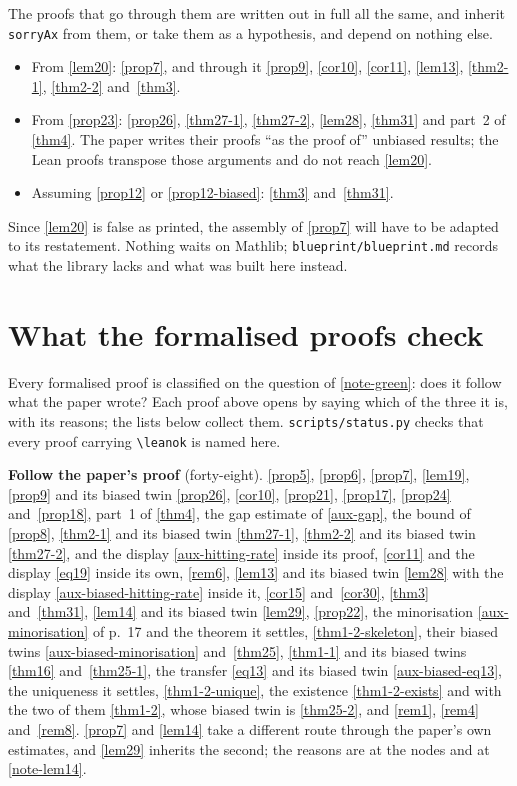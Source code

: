 The proofs that go through them are written out in full all the same, and
inherit \texttt{sorryAx} from them, or take them as a hypothesis, and depend
on nothing else.
\begin{itemize}
  \item From \ref{lem20}: \ref{prop7}, and through it \ref{prop9}, \ref{cor10},
    \ref{cor11}, \ref{lem13}, \ref{thm2-1}, \ref{thm2-2} and~\ref{thm3}.
  \item From \ref{prop23}: \ref{prop26}, \ref{thm27-1}, \ref{thm27-2},
    \ref{lem28}, \ref{thm31} and part~2 of \ref{thm4}.  The paper writes their
    proofs ``as the proof of'' unbiased results; the Lean proofs transpose those
    arguments and do not reach \ref{lem20}.
  \item Assuming \ref{prop12} or \ref{prop12-biased}: \ref{thm3} and~\ref{thm31}.
\end{itemize}
Since \ref{lem20} is false as printed, the assembly of \ref{prop7} will have to be
adapted to its restatement.  Nothing waits on Mathlib;
\texttt{blueprint/blueprint.md} records what the library lacks and what was built
here instead.

\section{What the formalised proofs check}
\label{sec:audit}

Every formalised proof is classified on the question of \ref{note-green}: does it
follow what the paper wrote?  Each proof above opens by saying which of the
three it is, with its reasons; the lists below collect them.
\texttt{scripts/status.py} checks that every proof carrying
\texttt{\textbackslash leanok} is named here.

\medskip \noindent\textbf{Follow the paper's proof} (forty-eight). \ref{prop5},
\ref{prop6}, \ref{prop7}, \ref{lem19}, \ref{prop9} and its biased twin \ref{prop26},
\ref{cor10}, \ref{prop21}, \ref{prop17},
\ref{prop24} and~\ref{prop18}, part~1 of \ref{thm4}, the gap estimate of
\ref{aux-gap}, the bound of \ref{prop8}, \ref{thm2-1} and its biased twin
\ref{thm27-1}, \ref{thm2-2} and its biased twin \ref{thm27-2}, and the display
\ref{aux-hitting-rate} inside its proof, \ref{cor11} and the display
\ref{eq19} inside its own, \ref{rem6}, \ref{lem13} and its biased twin \ref{lem28}
with the display \ref{aux-biased-hitting-rate} inside it, \ref{cor15}
and~\ref{cor30},
\ref{thm3} and~\ref{thm31}, \ref{lem14} and its biased twin \ref{lem29},
\ref{prop22}, the minorisation \ref{aux-minorisation} of p.~17
and the theorem it settles, \ref{thm1-2-skeleton}, their biased twins
\ref{aux-biased-minorisation} and~\ref{thm25}, \ref{thm1-1} and its biased
twins \ref{thm16} and~\ref{thm25-1}, the transfer \ref{eq13} and its biased twin
\ref{aux-biased-eq13}, the uniqueness it settles, \ref{thm1-2-unique}, the
existence \ref{thm1-2-exists} and with the two of them \ref{thm1-2}, whose biased
twin is \ref{thm25-2}, and \ref{rem1}, \ref{rem4}
and~\ref{rem8}.
\ref{prop7} and \ref{lem14} take a different route through the paper's own
estimates, and \ref{lem29} inherits the second; the reasons are at the nodes and
at \ref{note-lem14}.

